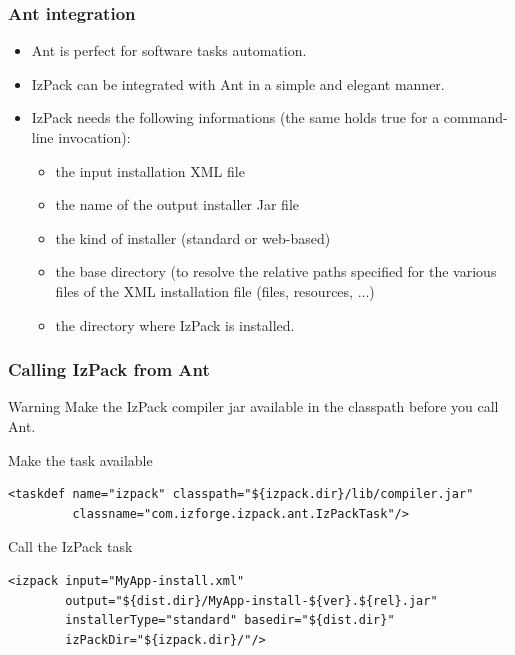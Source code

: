 \documentclass[compress,10pt]{beamer}
\begin{document}
\begin{frame}

\frametitle{Ant integration}

\begin{itemize}

  \item Ant is perfect for software tasks automation.

  \item IzPack can be integrated with Ant in a simple and elegant manner.

  \item IzPack needs the following informations (the same holds true for a
  command-line invocation):
    \begin{itemize}
      \item the input installation XML file

      \item the name of the output installer Jar file

      \item the kind of installer (standard or web-based)

      \item the base directory (to resolve the relative paths specified for the
      various files of the XML installation file (files, resources, ...)

      \item the directory where IzPack is installed.
    \end{itemize}

\end{itemize}

\end{frame}


\begin{frame}[containsverbatim]

\frametitle{Calling IzPack from Ant}

\begin{alertblock}{Warning}
Make the IzPack compiler jar available in the classpath before you call Ant.
\end{alertblock}

\begin{block}{Make the task available}
\tiny
\begin{verbatim}
<taskdef name="izpack" classpath="${izpack.dir}/lib/compiler.jar"
         classname="com.izforge.izpack.ant.IzPackTask"/>
\end{verbatim}
\end{block}

\begin{block}{Call the IzPack task}
\tiny
\begin{verbatim}
<izpack input="MyApp-install.xml"
        output="${dist.dir}/MyApp-install-${ver}.${rel}.jar"
        installerType="standard" basedir="${dist.dir}"
        izPackDir="${izpack.dir}/"/>
\end{verbatim}
\end{block}

\end{frame}
\end{document}
